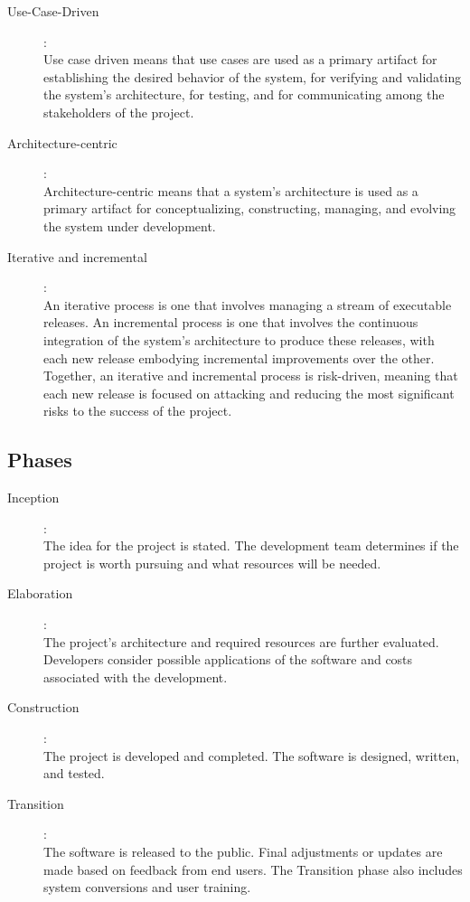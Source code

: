 \begin{minipage}[t]{0.5\linewidth}
\begin{description}
\item[Use-Case-Driven]:\\
  Use case driven means that use cases are used as a primary artifact for
  establishing the desired behavior of the system, for verifying and
  validating the system's architecture, for testing, and for communicating
  among the stakeholders of the project.
\item[Architecture-centric]:\\
  Architecture-centric means that a system's architecture is used as a
  primary artifact for conceptualizing, constructing, managing, and
  evolving the system under development.
\item[Iterative and incremental]:\\
  An iterative process is one that involves managing a stream of
  executable releases. An incremental process is one that involves
  the continuous integration of the system's architecture to produce
  these releases, with each new release embodying incremental improvements
  over the other. Together, an iterative and incremental process is
  risk-driven, meaning that each new release is focused on attacking and
  reducing the most significant risks to the success of the project.
\end{description}
\newpage
\subsection{Phases}
\begin{description}
\item[Inception]:\\
  The idea for the project is stated. The development team determines
  if the project is worth pursuing and what resources will be needed.
\item[Elaboration]:\\
  The project's architecture and required resources are further evaluated.
  Developers consider possible applications of the software and costs
  associated with the development.
\item[Construction]:\\
  The project is developed and completed. The software is designed,
  written, and tested.
\item[Transition]:\\
 The software is released to the public. Final adjustments or updates are
 made based on feedback from end users.
 The Transition phase also includes system conversions and user training.
\end{description}


\end{minipage}
